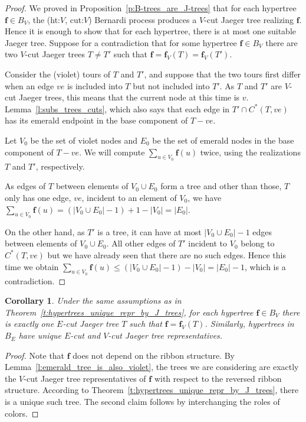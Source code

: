 \documentclass[10pt]{amsart}
\newtheorem{coro}[theo]{Corollary}
\theoremstyle{definition}\newtheorem{defi}[theo]{Definition}
\theoremstyle{remark}\newtheorem{rema}[theo]{Remark}
\begin{document}
\begin{proof} We proved in Proposition~\ref{p:B-trees_are_J-trees} that for each hypertree $\mathbf f\in B_V$, the (ht:$V$, cut:$V$) Bernardi process produces a $V$-cut Jaeger tree realizing $\mathbf f$. Hence it is enough to show that for each hypertree, there is at most one suitable Jaeger tree. Suppose for a contradiction that for some hypertree $\mathbf f\in B_V$ there are two $V$-cut Jaeger trees $T\neq T'$ such that $\mathbf f=\mathbf f_V(T)=\mathbf f_V(T')$. 
	
Consider the (violet) tours of $T$ and $T'$, and suppose that the two tours first differ when an edge $ve$ is included into $T$ but not included into $T'$. As $T$ and $T'$ are $V$-cut Jaeger trees, this means that the current node at this time is $v$. \cf Lemma~\ref{l:subs_trees_cuts}, which also says that each edge in $T'\cap C^*(T,ve)$ has its emerald endpoint in the base component of $T-ve$. 

Let $V_0$ be the set of violet nodes and $E_0$ be the set of emerald nodes in the base component of $T-ve$. We will compute $\sum_{u\in V_0}\mathbf f(u)$ twice, using the realizations $T$ and $T'$, respectively.

As edges of $T$ between elements of $V_0\cup E_0$ form a tree and other than those, $T$ only has one edge, $ve$, incident to an element of $V_0$, we have $\sum_{u\in V_0}\mathbf f(u)=(|V_0\cup E_0|-1)+1-|V_0|=|E_0|$. 

On the other hand, as $T'$ is a tree, it can have at most $|V_0\cup E_0|-1$ edges between elements of $V_0\cup E_0$. All other edges of $T'$ incident to $V_0$ belong to $C^*(T,ve)$ but we have already seen that there are no such edges. Hence this time we obtain $\sum_{u\in V_0}\mathbf f(u)\le (|V_0\cup E_0|-1)-|V_0|=|E_0|-1$, which is a contradiction.
\end{proof}

\begin{coro}
\label{cor:V_hyper_by_emerald_J_repr}
Under the same assumptions as in Theorem~\ref{t:hypertrees_unique_repr_by_J_trees}, for each hypertree $\mathbf f\in B_V$ there is exactly one $E$-cut Jaeger tree $T$ such that $\mathbf f=\mathbf f_V(T)$. Similarly, hypertrees in $B_E$ have unique $E$-cut and $V$-cut Jaeger tree representatives.
\end{coro}

\begin{proof}
Note that $\mathbf f$ does not depend on the ribbon structure. By Lemma~\ref{l:emerald_tree_is_also_violet}, the trees we are considering are exactly the $V$-cut Jaeger tree representatives of $\mathbf f$ with respect to the reversed ribbon structure. According to Theorem~\ref{t:hypertrees_unique_repr_by_J_trees}, there is a unique such tree. The second claim follows by interchanging the roles of colors.
\end{proof}
\end{document}
